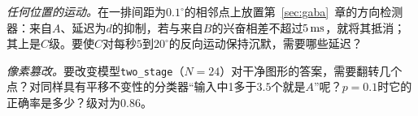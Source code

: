 \begin{exercise}[\lvlB]
\label{ex:12:7}
\emph{任何位置的运动。}在一排间距为$0.1^\circ$的相邻点上放置第~\ref{sec:gaba}~章的方向检测器：来自$A$、延迟为$d$的抑制，若与来自$B$的兴奋相差不超过$5\,\text{ms}$，就将其抵消；其上是$C$级。要使$C$对每秒$5$到$20^\circ$的反向运动保持沉默，需要哪些延迟？
\end{exercise}

\begin{exercise}[\lvlC]
\label{ex:12:8}
\emph{像素篡改。}要改变模型\texttt{two\_stage}（$N=24$）对干净图形的答案，需要翻转几个点？对同样具有平移不变性的分类器“输入中1多于$3.5$个就是$A$”呢？$p=0.1$时它的正确率是多少？级对为$0.86$。
\end{exercise}
